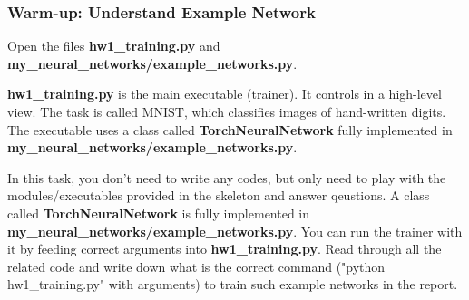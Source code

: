 \documentclass{article}
\newcommand{\homeworknumber}{1}
\begin{document}
\subsubsection*{Warm-up: Understand Example Network}

\noindent Open the files \textbf{hw1\_training.py} and \textbf{my\_neural\_networks/example\_networks.py}.

\hfill


\noindent \textbf{hw1\_training.py} is the main executable (trainer). It controls in a high-level view. The task is called MNIST, which classifies images of hand-written digits. The executable uses a class called \textbf{TorchNeuralNetwork} fully implemented in \textbf{my\_neural\_networks/example\_networks.py}.


\hfill

\noindent In this task, you don't need to write any codes, but only need to play with the modules/executables provided in the skeleton and answer qeustions. A class called \textbf{TorchNeuralNetwork} is fully implemented in \textbf{my\_neural\_networks/example\_networks.py}. You can run the trainer with it by feeding correct arguments into \textbf{hw\homeworknumber\_training.py}. Read through all the related code and write down what is the correct command ("python hw\homeworknumber\_training.py" with arguments) to train such example networks in the report.

\hfill
\end{document}
